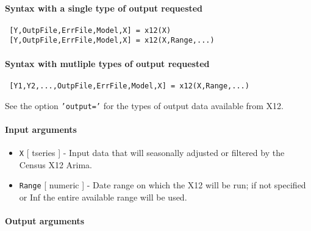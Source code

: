 


	\paragraph{Syntax with a single type of output requested}
 
 \begin{verbatim}
 [Y,OutpFile,ErrFile,Model,X] = x12(X)
 [Y,OutpFile,ErrFile,Model,X] = x12(X,Range,...)
 \end{verbatim}
 
 \paragraph{Syntax with mutliple types of output requested}
 
 \begin{verbatim}
 [Y1,Y2,...,OutpFile,ErrFile,Model,X] = x12(X,Range,...)
 \end{verbatim}
 
 See the option \texttt{'output='} for the types of output data available
 from X12.
 
 \paragraph{Input arguments}
 
 \begin{itemize}
 \item
   \texttt{X} {[} tseries {]} - Input data that will seasonally adjusted
   or filtered by the Census X12 Arima.
 \item
   \texttt{Range} {[} numeric {]} - Date range on which the X12 will be
   run; if not specified or Inf the entire available range will be used.
 \end{itemize}
 
 \paragraph{Output arguments}
 
